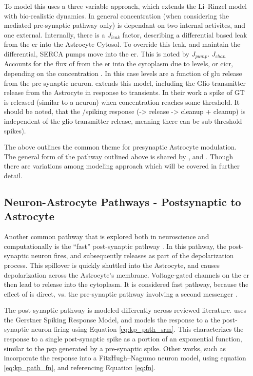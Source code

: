     To model this \parencite{pitta_2009} uses a three variable approach, which
    extends the Li–Rinzel model with bio-realistic \ipt dynamics. In general \ca
    concentration (when considering the \ipt mediated pre-synaptic pathway only)
    is dependant on two internal activites, and one external. Internally, there
    is a $J_{leak}$ factor, describing a differential based leak from the \Gls{er}
    into the Astrocyte Cytosol. To override this leak, and maintain the
    differential, SERCA pumps move \ca into the \Gls{er}. This is noted by
    $J_{pump}$. $J_{chan}$ Accounts for the flux of \ca from the \Gls{er} into the
    cytoplasm due to \ipt levels, or \Gls{cicr}, depending on the \ca concentration
    \cite{pitta_2009}. In this case \ipt levels are a function of \Gls{glu}
    release from the pre-synaptic neuron. \parencite{pitta_2016} extends this model,
    including the Glio-transmitter release from the Astrocyte in response to
    \ca transients. In their work a spike of GT is released (similar to a
    neuron) when \ca concentration reaches some threshold. It should be noted,
    that the \ipt/\ca spiking response (\ipt -> \ca release -> \ipt cleanup + \ca
    cleanup) is independent of the glio-transmitter release, meaning there can be
    sub-threshold \ca spikes).

    The above outlines the common theme for presynaptic Astrocyte
    modulation. The general form of the pathway outlined above is shared by
    \parencite{postnov_2009}, and \parencite{wade_2011}. Though there are
    variations among modeling approach which will be covered in further detail.

    \subsection{Neuron-Astrocyte Pathways - Postsynaptic to Astrocyte}
    Another common pathway that is explored both in neuroscience and
    computationally is the ``fast'' post-synaptic pathway \cite{bassam_2015}. In
    this pathway, the post-synaptic neuron fires, and subsequently releases \kp
    as part of the depolarization process. This \kp spillover is quickly shuttled
    into the Astrocyte, and causes depolarization across the Astrocyte's
    membrane. Voltage-gated channels on the \Gls{er} then lead to \ca release into
    the cytoplasm. It is considered fast pathway, because the effect of \kp is
    direct, vs. the pre-synaptic pathway involving a second messenger
    \cite{bassam_2015}.

    The post-synaptic pathway is modeled differently across reviewed
    literature. \parencite{bassam_2015} uses the Gerstner Spiking Response
    Model, and models the \ca response to a the post-synaptic neuron firing
    using Equation \ref{eq:kp_path_srm}. This characterizes the response to a
    single post-synaptic spike as a portion of an exponential function, similar
    to the \Gls{psp} generated by a pre-synaptic spike. Other works, such as
    \parencite{postnov_2007} incorporate the \ca response into a FitzHugh–Nagumo
    neuron model, using equation \ref{eq:kp_path_fn}, and referencing Equation
    \ref{eq:fn}.

